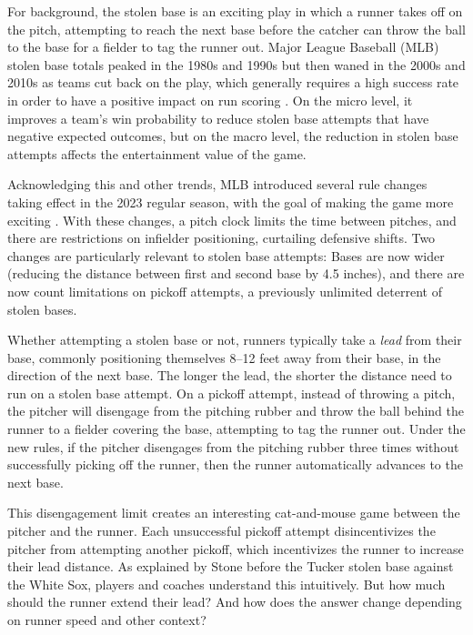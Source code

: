\documentclass{article}
\begin{document}
    For background, the stolen base is an exciting play in which a runner takes off on the pitch, attempting to reach the next base before the catcher can throw the ball to the base for a fielder to tag the runner out. Major League Baseball (MLB) stolen base totals peaked in the 1980s and 1990s but then waned in the 2000s and 2010s as teams cut back on the play, which generally requires a high success rate in order to have a positive impact on run scoring \parencite{tango_book_2007}. On the micro level, it improves a team's win probability to reduce stolen base attempts that have negative expected outcomes, but on the macro level, the reduction in stolen base attempts affects the entertainment value of the game.

    Acknowledging this and other trends, MLB introduced several rule changes taking effect in the 2023 regular season, with the goal of making the game more exciting \parencite{castrovince_pitch_2023}. With these changes, a pitch clock limits the time between pitches, and there are restrictions on infielder positioning, curtailing defensive shifts. Two changes are particularly relevant to stolen base attempts: Bases are now wider (reducing the distance between first and second base by 4.5 inches), and there are now count limitations on pickoff attempts, a previously unlimited deterrent of stolen bases.
    
    Whether attempting a stolen base or not, runners typically take a {\it lead} from their base, commonly positioning themselves 8--12 feet away from their base, in the direction of the next base. The longer the lead, the shorter the distance need to run on a stolen base attempt. On a pickoff attempt, instead of throwing a pitch, the pitcher will disengage from the pitching rubber and throw the ball behind the runner to a fielder covering the base, attempting to tag the runner out. Under the new rules, if the pitcher disengages from the pitching rubber three times without successfully picking off the runner, then the runner automatically advances to the next base.

    This disengagement limit creates an interesting cat-and-mouse game between the pitcher and the runner. Each unsuccessful pickoff attempt disincentivizes the pitcher from attempting another pickoff, which incentivizes the runner to increase their lead distance. As explained by Stone before the Tucker stolen base against the White Sox, players and coaches understand this intuitively. But how much should the runner extend their lead? And how does the answer change depending on runner speed and other context?
    
\end{document}
